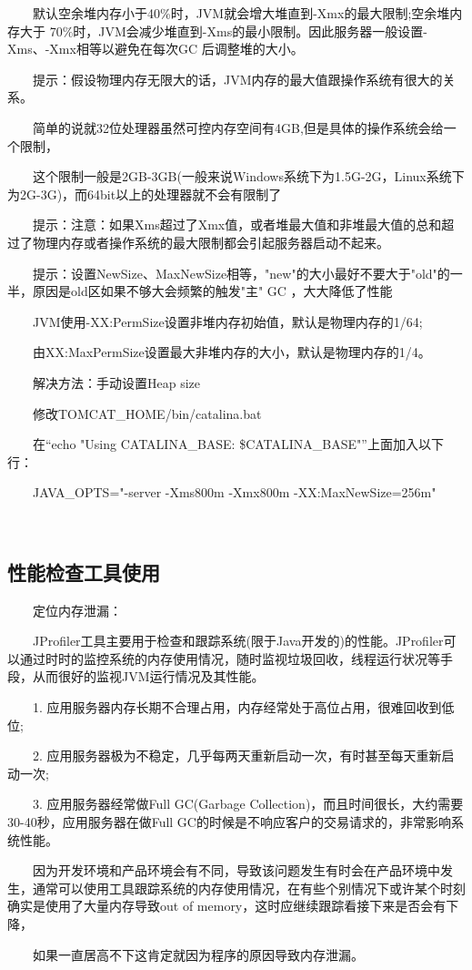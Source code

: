 \documentclass[a4paper, 11pt]{article}
\begin{document}
　　默认空余堆内存小于40\%时，JVM就会增大堆直到-Xmx的最大限制;空余堆内存大于
70\%时，JVM会减少堆直到-Xms的最小限制。因此服务器一般设置-Xms、-Xmx相等以避免在每次GC 后调整堆的大小。

　　提示：假设物理内存无限大的话，JVM内存的最大值跟操作系统有很大的关系。

　　简单的说就32位处理器虽然可控内存空间有4GB,但是具体的操作系统会给一个限制，

　　这个限制一般是2GB-3GB(一般来说Windows系统下为1.5G-2G，Linux系统下为2G-3G)，而64bit以上的处理器就不会有限制了

　　提示：注意：如果Xms超过了Xmx值，或者堆最大值和非堆最大值的总和超过了物理内存或者操作系统的最大限制都会引起服务器启动不起来。

　　提示：设置NewSize、MaxNewSize相等，"new"的大小最好不要大于"old"的一半，原因是old区如果不够大会频繁的触发"主" GC ，大大降低了性能

　　JVM使用-XX:PermSize设置非堆内存初始值，默认是物理内存的1/64;

　　由XX:MaxPermSize设置最大非堆内存的大小，默认是物理内存的1/4。

　　解决方法：手动设置Heap size

　　修改TOMCAT_HOME/bin/catalina.bat

　　在“echo "Using CATALINA_BASE: \$CATALINA_BASE"”上面加入以下行：

　　JAVA_OPTS="-server -Xms800m -Xmx800m -XX:MaxNewSize=256m"

　　\subsection{性能检查工具使用}

　　定位内存泄漏：

　　JProfiler工具主要用于检查和跟踪系统(限于Java开发的)的性能。JProfiler可以通过时时的监控系统的内存使用情况，随时监视垃圾回收，线程运行状况等手段，从而很好的监视JVM运行情况及其性能。

　　1. 应用服务器内存长期不合理占用，内存经常处于高位占用，很难回收到低位;

　　2. 应用服务器极为不稳定，几乎每两天重新启动一次，有时甚至每天重新启动一次;

　　3. 应用服务器经常做Full GC(Garbage Collection)，而且时间很长，大约需要30-40秒，应用服务器在做Full GC的时候是不响应客户的交易请求的，非常影响系统性能。

　　因为开发环境和产品环境会有不同，导致该问题发生有时会在产品环境中发生，通常可以使用工具跟踪系统的内存使用情况，在有些个别情况下或许某个时刻确实是使用了大量内存导致out of memory，这时应继续跟踪看接下来是否会有下降，

　　如果一直居高不下这肯定就因为程序的原因导致内存泄漏。
\end{document}
